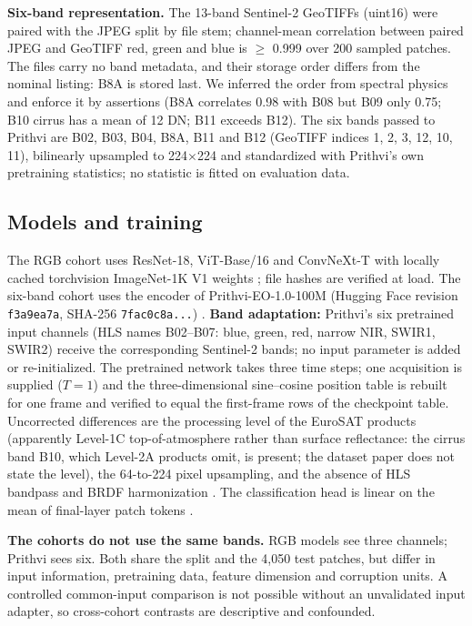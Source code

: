\documentclass[3p,times,procedia]{elsarticle}
\begin{document}
\textbf{Six-band representation.} The 13-band Sentinel-2 GeoTIFFs (uint16) were paired with the JPEG split by file stem; channel-mean correlation between paired JPEG and GeoTIFF red, green and blue is $\ge$ 0.999 over 200 sampled patches. The files carry no band metadata, and their storage order differs from the nominal listing: B8A is stored last. We inferred the order from spectral physics and enforce it by assertions (B8A correlates 0.98 with B08 but B09 only 0.75; B10 cirrus has a mean of 12 DN; B11 exceeds B12). The six bands passed to Prithvi are B02, B03, B04, B8A, B11 and B12 (GeoTIFF indices 1, 2, 3, 12, 10, 11), bilinearly upsampled to 224$\times$224 and standardized with Prithvi's own pretraining statistics; no statistic is fitted on evaluation data.

\subsection{Models and training}\label{sec:models}
The RGB cohort uses ResNet-18, ViT-Base/16 and ConvNeXt-T with locally cached torchvision ImageNet-1K V1 weights \cite{resnet,vit,convnext}; file hashes are verified at load. The six-band cohort uses the encoder of Prithvi-EO-1.0-100M (Hugging Face revision \texttt{f3a9ea7a}, SHA-256 \texttt{7fac0c8a...}) \cite{prithvi,prithvicard}. \textbf{Band adaptation:} Prithvi's six pretrained input channels (HLS names B02--B07: blue, green, red, narrow NIR, SWIR1, SWIR2) receive the corresponding Sentinel-2 bands; no input parameter is added or re-initialized. The pretrained network takes three time steps; one acquisition is supplied ($T{=}1$) and the three-dimensional sine--cosine position table is rebuilt for one frame and verified to equal the first-frame rows of the checkpoint table. Uncorrected differences are the processing level of the EuroSAT products (apparently Level-1C top-of-atmosphere rather than surface reflectance: the cirrus band B10, which Level-2A products omit, is present; the dataset paper does not state the level), the 64-to-224 pixel upsampling, and the absence of HLS bandpass and BRDF harmonization \cite{hls}. The classification head is linear on the mean of final-layer patch tokens \cite{mae}.

\textbf{The cohorts do not use the same bands.} RGB models see three channels; Prithvi sees six. Both share the split and the 4,050 test patches, but differ in input information, pretraining data, feature dimension and corruption units. A controlled common-input comparison is not possible without an unvalidated input adapter, so cross-cohort contrasts are descriptive and confounded.
\end{document}
